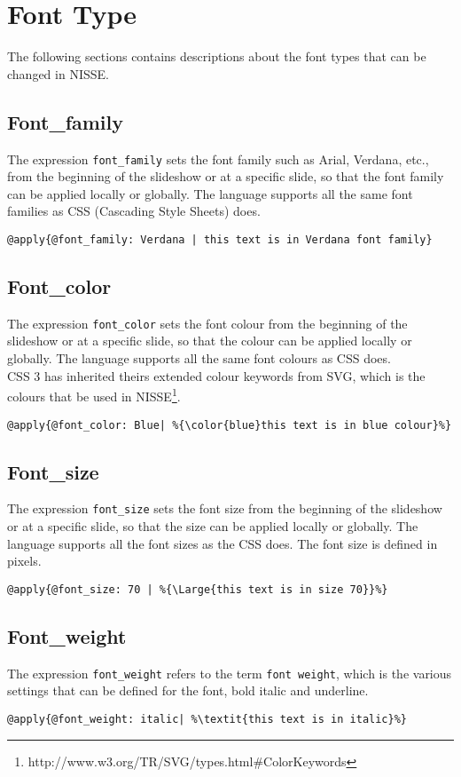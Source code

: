 \section{Font Type}
\label{AppendixFontType}
The following sections contains descriptions about the font types that can be changed in NISSE.

\subsection{Font\_family}
The expression \texttt{font\_family} sets the font family such as Arial, Verdana, etc., from the beginning of the slideshow or at a specific slide, so that the font family can be applied locally or globally. The language supports all the same font families as CSS (Cascading Style Sheets) does.

\begin{lstlisting}[frame=single]
	@apply{@font_family: Verdana | this text is in Verdana font family}
\end{lstlisting}

\subsection{Font\_color}
The expression \texttt{font\_color} sets the font colour from the beginning of the slideshow or at a specific slide, so that the colour can be applied locally or globally. The language supports all the same font colours as CSS does. \\
CSS 3 has inherited theirs extended colour keywords from SVG, which is the colours that be used in NISSE\footnote{http://www.w3.org/TR/SVG/types.html\#ColorKeywords}.

\begin{lstlisting}[frame=single]
	@apply{@font_color: Blue| %{\color{blue}this text is in blue colour}%}
\end{lstlisting}

\subsection{Font\_size}
The expression \texttt{font\_size} sets the font size from the beginning of the slideshow or at a specific slide, so that the size can be applied locally or globally. The language supports all the font sizes as the CSS does. The font size is defined in pixels.

\begin{lstlisting}[frame=single]
	@apply{@font_size: 70 | %{\Large{this text is in size 70}}%}
\end{lstlisting}

\subsection{Font\_weight}
The expression \texttt{font\_weight} refers to the term \texttt{font weight}, which is the various settings that can be defined for the font, bold italic and underline.

\begin{lstlisting}[frame=single]
	@apply{@font_weight: italic| %\textit{this text is in italic}%}
\end{lstlisting}